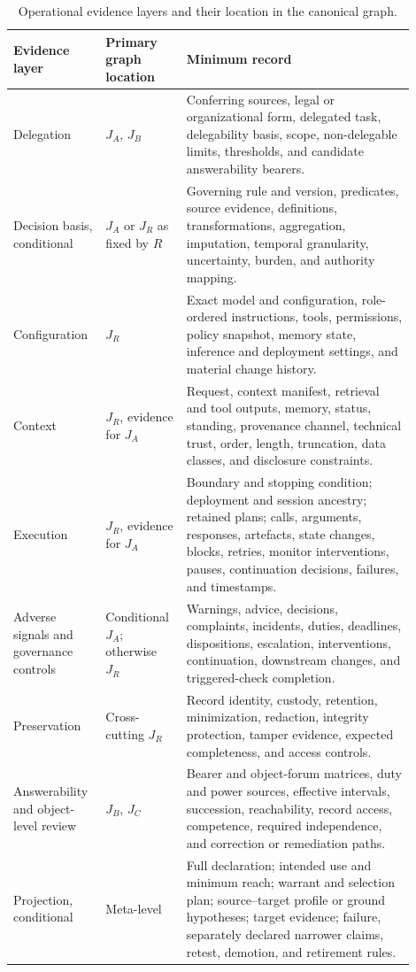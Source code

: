 \begin{table}[!htbp]
\scriptsize
\renewcommand{\arraystretch}{0.96}
\centering
\begin{tabular}{>{\raggedright\arraybackslash}p{0.19\linewidth}%
                >{\raggedright\arraybackslash}p{0.18\linewidth}%
                >{\raggedright\arraybackslash}p{0.53\linewidth}}
\toprule
Evidence layer & Primary graph location & Minimum record \\
\midrule
Delegation & \(J_A\), \(J_B\) & Conferring sources, legal or organizational form, delegated task, delegability basis, scope, non-delegable limits, thresholds, and candidate answerability bearers. \\
Decision basis, conditional & \(J_A\) or \(J_R\) as fixed by \(R\) & Governing rule and version, predicates, source evidence, definitions, transformations, aggregation, imputation, temporal granularity, uncertainty, burden, and authority mapping. \\
Configuration & \(J_R\) & Exact model and configuration, role-ordered instructions, tools, permissions, policy snapshot, memory state, inference and deployment settings, and material change history. \\
Context & \(J_R\), evidence for \(J_A\) & Request, context manifest, retrieval and tool outputs, memory, status, standing, provenance channel, technical trust, order, length, truncation, data classes, and disclosure constraints. \\
Execution & \(J_R\), evidence for \(J_A\) & Boundary and stopping condition; deployment and session ancestry; retained plans; calls, arguments, responses, artefacts, state changes, blocks, retries, monitor interventions, pauses, continuation decisions, failures, and timestamps. \\
Adverse signals and governance controls & Conditional \(J_A\); otherwise \(J_R\) & Warnings, advice, decisions, complaints, incidents, duties, deadlines, dispositions, escalation, interventions, continuation, downstream changes, and triggered-check completion. \\
Preservation & Cross-cutting \(J_R\) & Record identity, custody, retention, minimization, redaction, integrity protection, tamper evidence, expected completeness, and access controls. \\
Answerability and object-level review & \(J_B\), \(J_C\) & Bearer and object-forum matrices, duty and power sources, effective intervals, succession, reachability, record access, competence, required independence, and correction or remediation paths. \\
Projection, conditional & Meta-level & Full declaration; intended use and minimum reach; warrant and selection plan; source--target profile or ground hypotheses; target evidence; failure, separately declared narrower claims, retest, demotion, and retirement rules. \\
\bottomrule
\end{tabular}
\caption{Operational evidence layers and their location in the canonical graph.}
\label{tab:minimum-evidence-bundle}
\end{table}
\FloatBarrier

